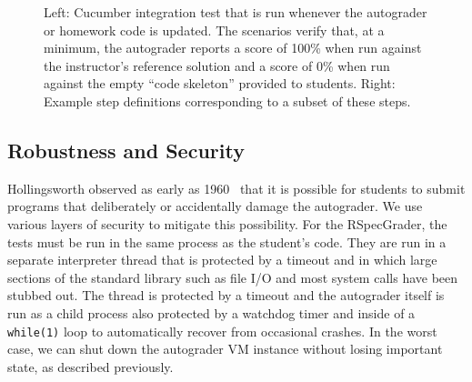 
\begin{figure}
  \begin{minipage}{0.5\textwidth}%
  \end{minipage}%
  \begin{minipage}{0.5\textwidth}%
  \end{minipage}
  \caption{\label{fig:rag-ci}%
  Left: Cucumber integration test that is run whenever the autograder or
  homework code is updated.  The scenarios verify that, at a minimum,
  the autograder reports a score of 100\% when run against the
  instructor's reference solution and a score of 0\% when run against
  the empty ``code skeleton'' provided to students.  Right: Example
  step definitions corresponding to a subset of these steps.
}
\end{figure}


\subsection{Robustness and Security}

Hollingsworth observed as early as 1960~\cite{hollingsworth60} that it
is possible for students 
to submit programs that deliberately or accidentally damage the autograder. 
We use various layers of security to mitigate this possibility.
For the RSpecGrader, the tests must be run in the same
process as the student's code.  They are run in a separate interpreter
thread that is protected by a timeout and in which large sections of the
standard library such as file I/O and most system calls have been
stubbed out.  The thread is protected by a timeout and the autograder
itself is run as a child process also protected by a watchdog timer and
inside of a \texttt{while(1)} loop to automatically recover from
occasional crashes.  In the worst case, we can shut down the autograder
VM instance without losing important state, as described previously.
 

